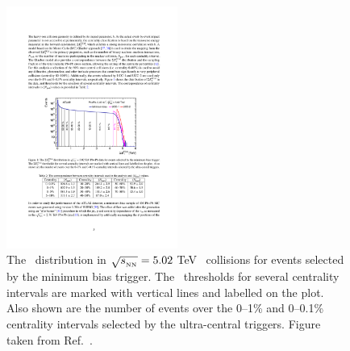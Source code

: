 \begin{figure}[ht]
	\centering
        \includegraphics[width=0.5\textwidth]{figures/setup/fcal_distr}
          \caption{The \ETfcal\ distribution in $\mbox{$\sqrt{s_{_\text{NN}}}$} = 5.02$ TeV \pbpb\ collisions for events selected by the minimum bias trigger.
          The \ETfcal\ thresholds for several centrality intervals are marked with vertical lines and labelled on the plot.
           Also shown are the number of events over the 0--1\% and 0--0.1\% centrality intervals selected by the ultra-central triggers.
           Figure taken from Ref.~\cite{Aaboud:2018ves}.}
          \label{fig:fcal_distr}
\end{figure}
